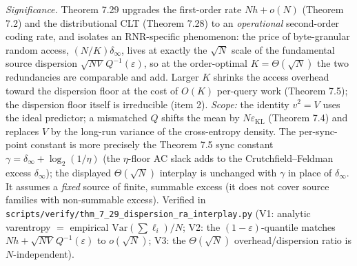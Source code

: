 \documentclass[
]{article}
\begin{document}
\emph{Significance.} Theorem 7.29 upgrades the first-order rate $Nh+o(N)$
(Theorem 7.2) and the distributional CLT (Theorem 7.28) to an \emph{operational}
second-order coding rate, and isolates an RNR-specific phenomenon: the price of
byte-granular random access, $(N/K)\delta_\infty$, lives at exactly the $\sqrt N$
scale of the fundamental source dispersion $\sqrt{NV}\,Q^{-1}(\varepsilon)$, so at
the order-optimal $K=\Theta(\sqrt N)$ the two redundancies are comparable and add.
Larger $K$ shrinks the access overhead toward the dispersion floor at the cost of
$O(K)$ per-query work (Theorem 7.5); the dispersion floor itself is irreducible
(item 2). \emph{Scope:} the identity $v^2=V$ uses the ideal predictor; a
mismatched $Q$ shifts the mean by $N\varepsilon_{\mathrm{KL}}$ (Theorem 7.4) and
replaces $V$ by the long-run variance of the cross-entropy density. The
per-sync-point constant is more precisely the Theorem 7.5 sync constant
$\gamma=\delta_\infty+\log_2(1/\eta)$ (the $\eta$-floor AC slack adds to the
Crutchfield--Feldman excess $\delta_\infty$); the displayed $\Theta(\sqrt N)$
interplay is unchanged with $\gamma$ in place of $\delta_\infty$. It assumes a
\emph{fixed} source of finite, summable excess (it does not cover source families
with non-summable excess). Verified in
\texttt{scripts/verify/thm\_7\_29\_dispersion\_ra\_interplay.py} (V1: analytic
varentropy $=$ empirical $\mathrm{Var}(\sum\ell_i)/N$; V2: the
$(1-\varepsilon)$-quantile matches $Nh+\sqrt{NV}\,Q^{-1}(\varepsilon)$ to
$o(\sqrt N)$; V3: the $\Theta(\sqrt N)$ overhead/dispersion ratio is
$N$-independent).
\end{document}

